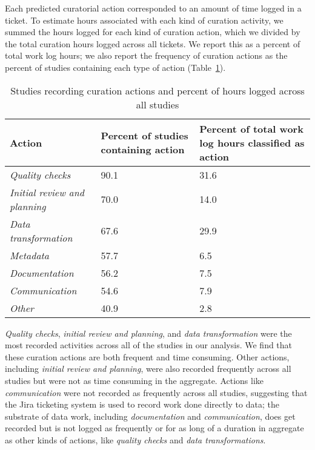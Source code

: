 \documentclass[conference]{IEEEtran}
\begin{document}
Each predicted curatorial action corresponded to an amount of time logged in a ticket. To estimate hours associated with each kind of curation activity, we summed the hours logged for each kind of curation action, which we divided by the total curation hours logged across all tickets. We report this as a percent of total work log hours; we also report the frequency of curation actions as the percent of studies containing each type of action (Table~\ref{table:actions}).

\begin{table}[t]
\centering
\caption{Studies recording curation actions and percent of hours logged across all studies}
\begin{tabularx}{\columnwidth}{|l|X|X|}
\hline
\textbf{Action}             & \textbf{Percent of studies containing action} & \textbf{Percent of total work log hours classified as action}   \\ \hline
\textit{Quality checks}              & 90.1                            & 31.6                                    \\ \hline
\textit{Initial review and planning} & 70.0                              & 14.0                                     \\ \hline
\textit{Data transformation}      & 67.6                            & 29.9                                     \\ \hline
\textit{Metadata}        & 57.7                            & 6.5                                      \\ \hline
\textit{Documentation}               & 56.2                            & 7.5                                      \\ \hline
\textit{Communication}     & 54.6                            & 7.9                                      \\ \hline
\textit{Other}                       & 40.9                            & 2.8                                      \\ \hline
\end{tabularx}
\label{table:actions}
\end{table}

\textit{Quality checks}, \textit{initial review and planning}, and \textit{data transformation} were the most recorded activities across all of the studies in our analysis. We find that these curation actions are both frequent and time consuming. Other actions, including \textit{initial review and planning}, were also recorded frequently across all studies but were not as time consuming in the aggregate. Actions like \textit{communication} were not recorded as frequently across all studies, suggesting that the Jira ticketing system is used to record work done directly to data; the substrate of data work, including \textit{documentation} and \textit{communication}, does get recorded but is not logged as frequently or for as long of a duration in aggregate as other kinds of actions, like \textit{quality checks} and \textit{data transformations}.  
\end{document}
